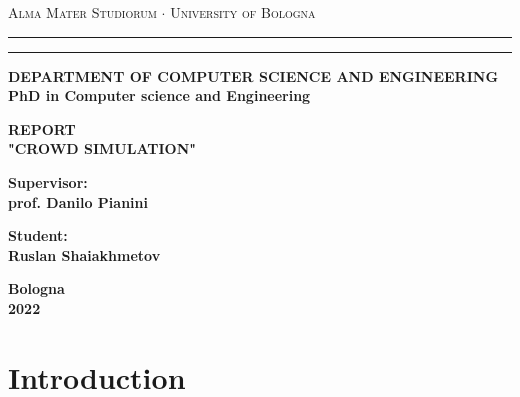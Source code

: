 \documentclass[12pt,a4paper]{report}
\begin{document}
\begin{titlepage}
\begin{center}
{{\Large{\textsc{Alma Mater Studiorum $\cdot$ University of
Bologna}}}} \rule[0.1cm]{15.8cm}{0.1mm}
\rule[0.5cm]{15.8cm}{0.6mm}
{\small{\bf DEPARTMENT OF COMPUTER SCIENCE AND ENGINEERING\\
PhD in Computer science and Engineering }}
\end{center}
\vspace{15mm}
\begin{center}
{\LARGE{\bf REPORT}}\\
\vspace{3mm}
{\LARGE{\bf "CROWD SIMULATION"}}\\
\vspace{3mm}
\end{center}
\vspace{40mm}
\par
\noindent
\begin{minipage}[t]{0.47\textwidth}
{\large{\bf Supervisor:\\
prof. Danilo Pianini}}
\end{minipage}
\hfill
\begin{minipage}[t]{0.47\textwidth}\raggedleft
{\large{\bf Student:\\
Ruslan Shaiakhmetov}}
\end{minipage}
\vspace{60mm}
\begin{center}
{\large{\bf Bologna \\ 2022 }}%
\end{center}
\end{titlepage}
\chapter*{Introduction}
\end{document}
